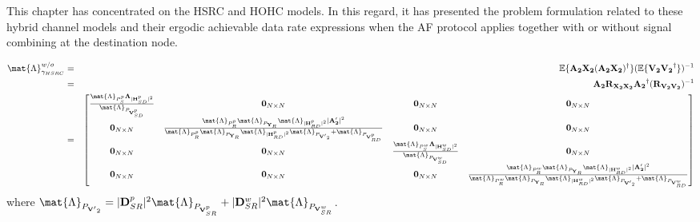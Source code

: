This chapter has concentrated on the \ac{HSRC} and \ac{HOHC} models. In this regard, it has presented the problem formulation related to these hybrid channel models and their ergodic achievable data rate expressions when the \ac{AF} protocol applies together with or without signal combining at the destination node. 

\begin{landscape}

\begin{eqnarray}\label{SNRhsrc}
\mat{\Lambda}_{\gamma_{HSRC}}^{w/o} & = & \mathbb{E}\{\mathbf{A_2}\mathbf{X_2}(\mathbf{A_2}\mathbf{X_2})^\dagger\}(\mathbb{E}\{\mathbf{V_2}\mathbf{V_2}^\dagger\})^{-1} \nonumber\\
& = & \mathbf{A_2} \mathbf{R}_{\mathbf{X_2}\mathbf{X_2}} \mathbf{A_2}^\dagger (\mathbf{R}_{\mathbf{V_2}\mathbf{V_2}})^{-1} \nonumber\\
& = & \begin{bmatrix}  \frac{\mat{\Lambda}_{P_{S}^{p}} \mathbf{\Lambda}_{|\mathbf{H}_{SD}^p|^2}} {\mat{\Lambda}_{P_{\mathbf{V}_{SD}^p}}} & \mathbf{0}_{N \times N} & \mathbf{0}_{N \times N} & \mathbf{0}_{N \times N} \\ \mathbf{0}_{N \times N} & \frac{\mat{\Lambda}_{P_{R}^p} \mat{\Lambda}_{P_{\mathbf{Y}_{R}}} \mat{\Lambda}_{|\mathbf{H}_{RD}^p|^2} |\mathbf{A'_2}|^2}{\mat{\Lambda}_{P_{R}^{p}} \mat{\Lambda}_{P_{\mathbf{Y}_{R}}} \mat{\Lambda}_{|\mathbf{H}_{RD}^p|^2} \mat{\Lambda}_{P_{\mathbf{V'}_2}} + \mat{\Lambda}_{P_{\mathbf{V}_{RD}^p}}} & \mathbf{0}_{N \times N} & \mathbf{0}_{N \times N} \\ \mathbf{0}_{N \times N} & \mathbf{0}_{N \times N} & \frac{\mat{\Lambda}_{P_{S}^{w}} \mathbf{\Lambda}_{|\mathbf{H}_{SD}^w|^2}} {\mat{\Lambda}_{P_{\mathbf{V}_{SD}^w}}} & \mathbf{0}_{N \times N} \\ \mathbf{0}_{N \times N} & \mathbf{0}_{N \times N} & \mathbf{0}_{N \times N} & \frac{\mat{\Lambda}_{P_{R}^w} \mat{\Lambda}_{P_{\mathbf{Y}_{R}}} \mat{\Lambda}_{|\mathbf{H}_{RD}^w|^2} |\mathbf{A'_2}|^2}{\mat{\Lambda}_{P_{R}^{w}} \mat{\Lambda}_{P_{\mathbf{Y}_{R}}} \mat{\Lambda}_{|\mathbf{H}_{RD}^w|^2} \mat{\Lambda}_{P_{\mathbf{V'}_2}} + \mat{\Lambda}_{P_{\mathbf{V}_{RD}^w}}} \end{bmatrix}
\end{eqnarray}
where $ \mat{\Lambda}_{P_{\mathbf{V'}_2}} = |\mathbf{D}_{SR}^{p}|^2 \mat{\Lambda}_{P_{\mathbf{V}_{SR}^p}} + |\mathbf{D}_{SR}^{w}|^2 \mat{\Lambda}_{P_{\mathbf{V}_{SR}^w}} $.


\end{landscape}
